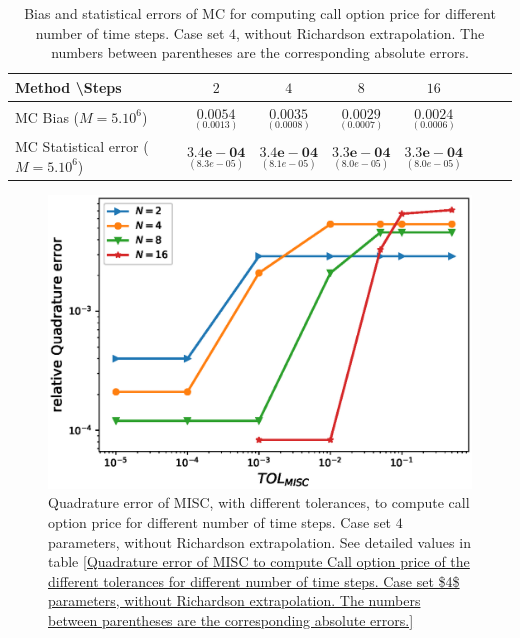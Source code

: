 \begin{table}[h!]
	\centering
	\begin{tabular}{l*{6}{c}r}
		Method \textbackslash  Steps            & $2$ & $4$ & $8$ & $16$  \\
		\hline
		MC Bias ($M=5.10^6$)   & 	$ \underset{(    0.0013)}{\mathbf{0.0054}}$  & $\underset{(0.0008)}{\mathbf{0.0035
		}}$  & $\underset{(0.0007)}{\mathbf{0.0029}}$ & $\underset{(0.0006)}{\mathbf{0.0024}}$\\ 
		
		MC Statistical error ($M=5.10^6$)  &  $\underset{(   8.3e-05)} {\mathbf{3.4e-04}}$  & $\underset{(8.1e-05)} {\mathbf{3.4e-04}}$  & $\underset{(8.0e-05)} {\mathbf{3.3e-04 }}$ & $\underset{(8.0e-05)} {\mathbf{3.3e-04}}$	\\
		
		\hline
	\end{tabular}
	\caption{Bias and statistical errors of MC   for computing call option price  for different number of time steps. Case set $4$, without Richardson extrapolation. The numbers between parentheses are the corresponding absolute errors.}
	\label{Bias and Statistical errors of MC ($M=5.10^6$)  for computing Call option price  for different number of time steps. Case set 4, without Richardson extrapolation. The numbers between parentheses are the corresponding absolute errors.}
\end{table}





\begin{figure}[h!]
	\centering
	\includegraphics[width=0.5\linewidth]{./figures/rBergomi_MISC_quadratre_error/vs_TOL/set6/relative_quad_error_wrt_MISC_TOL_set6_non_rich}
	
	
	\caption{Quadrature error of MISC, with different tolerances, to compute call option price  for different number of time steps. Case  set $4$ parameters, without Richardson extrapolation.  See detailed values  in table \ref{Quadrature error of MISC to compute Call option price of the different tolerances for different number of time steps. Case  set $4$ parameters, without Richardson extrapolation. The numbers between parentheses are the corresponding absolute errors.}}
	\label{fig:Quadrature_error_set4}
\end{figure}





